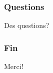 \documentclass[french]{beamer}
\begin{document}
\begin{frame}
\frametitle{Questions}

\begin{center}
Des questions?
\end{center}

\end{frame}

\begin{frame}
\frametitle{Fin}

\begin{center}
Merci!
\end{center}

\end{frame}
\end{document}
